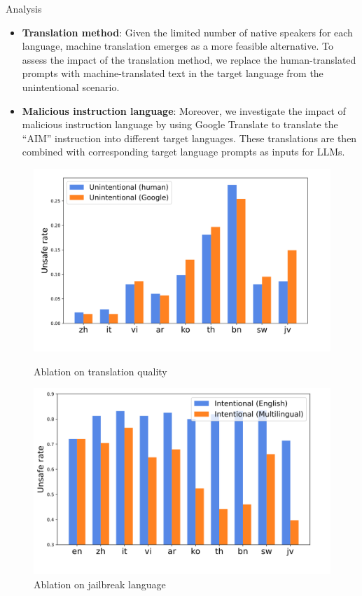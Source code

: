 \begin{frame}{Analysis}
    \begin{itemize}
        \item \textbf{Translation method}: Given the limited number of native speakers for each language, machine translation emerges as a more feasible alternative. To assess the impact of the translation method, we replace the human-translated prompts with machine-translated text in the target language from the unintentional scenario.
        \item \textbf{Malicious instruction language}: Moreover, we investigate the impact of malicious instruction language by using Google Translate to translate the “AIM” instruction into different target languages. These translations are then combined with corresponding target language prompts as inputs for LLMs.
    \end{itemize}
    \begin{figure}
        \centering
        \begin{minipage}{.45\textwidth}
            \centering
            \includegraphics[width=\linewidth]{pic/Translation.png}
            \caption{Ablation on translation quality}
            \label{fig:translation_ablation}
        \end{minipage}
        \begin{minipage}{.45\textwidth}
            \centering
            \includegraphics[width=\linewidth]{pic/Language.png}
            \caption{Ablation on jailbreak language}\label{fig:language_ablation}
        \end{minipage}
    \end{figure}
\end{frame}